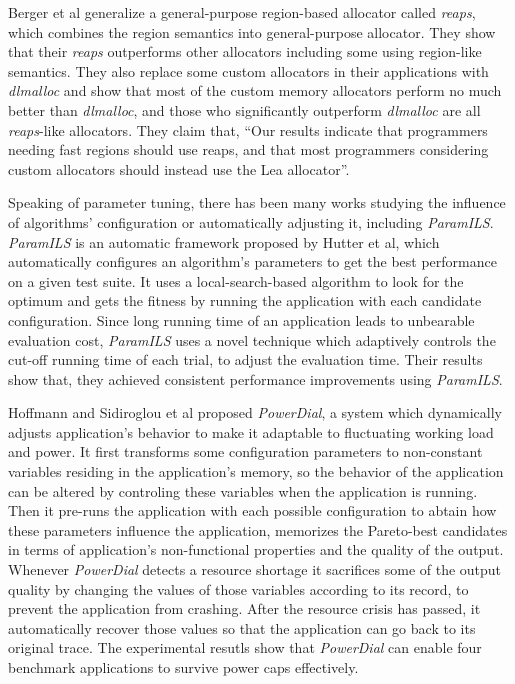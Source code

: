 \documentclass{acm_proc_article-sp}
\begin{document}
Berger et al\cite{Berger:2002:RCM:583854.582421} generalize a general-purpose region-based allocator called \emph{reaps}, which combines the region semantics into general-purpose allocator. They show that their \emph{reaps} outperforms other allocators including some using region-like semantics. They also replace some custom allocators in their applications with \emph{dlmalloc} and show that most of the custom memory allocators perform no much better than \emph{dlmalloc}, and those who significantly outperform \emph{dlmalloc} are all \emph{reaps}-like allocators. They claim that, ``Our results indicate that programmers needing fast regions should use reaps, and that most programmers considering custom allocators should instead use the Lea allocator''.

Speaking of parameter tuning, there has been many works studying the influence of algorithms' configuration or automatically adjusting it, including \emph{ParamILS}\cite{hutter2009paramils}. \emph{ParamILS} is an automatic framework proposed by Hutter et al, which automatically configures an algorithm's parameters to get the best performance on a given test suite. It uses a local-search-based algorithm to look for the optimum and gets the fitness by running the application with each candidate configuration. Since long running time of an application leads to unbearable evaluation cost, \emph{ParamILS} uses a novel technique which adaptively controls the cut-off running time of each trial, to adjust the evaluation time. Their results show that, they achieved consistent performance improvements using \emph{ParamILS}.

Hoffmann and Sidiroglou et al\cite{Hoffmann:2011:DKR:1961296.1950390} proposed \emph{PowerDial}, a system which dynamically adjusts application's behavior to make it adaptable to fluctuating working load and power. It first transforms some configuration parameters to non-constant variables residing in the application's memory, so the behavior of the application can be altered by controling these variables when the application is running. Then it pre-runs the application with each possible configuration to abtain how these parameters influence the application, memorizes the Pareto-best candidates in terms of application's non-functional properties and the quality of the output. Whenever \emph{PowerDial} detects a resource shortage it sacrifices some of the output quality by changing the values of those variables according to its record, to prevent the application from crashing. After the resource crisis has passed, it automatically recover those values so that the application can go back to its original trace. The experimental resutls show that \emph{PowerDial} can enable four benchmark applications to survive power caps effectively.
\end{document}
